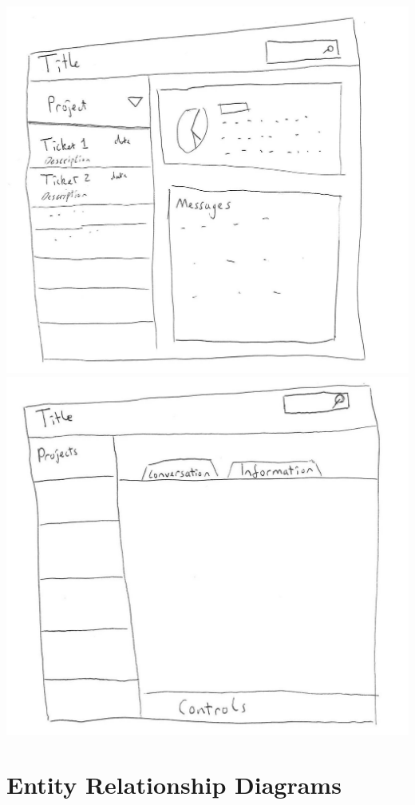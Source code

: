 \documentclass[a4paper]{l3proj}
\begin{document}
\includegraphics[scale=0.35]{mockup1}
\includegraphics[scale=0.35]{mockup2}


\section{Entity Relationship Diagrams}
\end{document}
